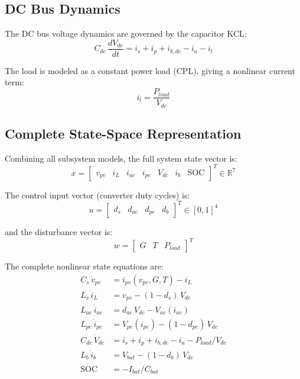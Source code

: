 \documentclass[journal]{IEEEtran}
\begin{document}
\subsection{DC Bus Dynamics}
\label{subsec:dcbus}

The DC bus voltage dynamics are governed by the capacitor KCL:
\begin{equation}
C_{dc}\,\frac{dV_{dc}}{dt} = i_s + i_p + i_{b,dc} - i_a - i_l
\label{eq:dcbus}
\end{equation}

The load is modeled as a constant power load (CPL), giving a nonlinear
current term:
\begin{equation}
i_l = \frac{P_{load}}{V_{dc}}
\label{eq:dcbus_load}
\end{equation}

\subsection{Complete State-Space Representation}
\label{subsec:statespace}

Combining all subsystem models, the full system state vector is:
\begin{equation}
x = \begin{bmatrix}
v_{pv} & i_L & i_{ae} & i_{pe} & V_{dc} & i_b & \text{SOC}
\end{bmatrix}^T \in \mathbb{R}^7
\label{eq:state_vec}
\end{equation}

The control input vector (converter duty cycles) is:
\begin{equation}
u = \begin{bmatrix}d_s & d_{ae} & d_{pe} & d_b\end{bmatrix}^T \in [0,1]^4
\label{eq:ctrl_vec}
\end{equation}

and the disturbance vector is:
\begin{equation}
w = \begin{bmatrix}G & T & P_{load}\end{bmatrix}^T
\label{eq:dist_vec}
\end{equation}

The complete nonlinear state equations are:
\begin{equation}
\begin{aligned}
C_s\,\dot{v}_{pv}      &= i_{pv}(v_{pv},G,T) - i_L \\
L_s\,\dot{i}_L         &= v_{pv} - (1-d_s)\,V_{dc} \\
L_{ae}\,\dot{i}_{ae}   &= d_{ae}\,V_{dc} - V_{ae}(i_{ae}) \\
L_{pe}\,\dot{i}_{pe}   &= V_{pe}(i_{pe}) - (1-d_{pe})\,V_{dc} \\
C_{dc}\,\dot{V}_{dc}   &= i_s + i_p + i_{b,dc} - i_a - P_{load}/V_{dc} \\
L_b\,\dot{i}_b         &= V_{bat} - (1-d_b)\,V_{dc} \\
\dot{\text{SOC}}       &= -I_{bat}/C_{bat}
\end{aligned}
\label{eq:full_statespace}
\end{equation}
\end{document}
